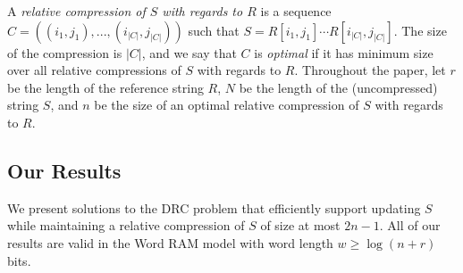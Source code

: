 A \emph{relative compression of $S$ with regards to $R$} is a sequence $C=((i_1,j_1),...,(i_{|C|},j_{|C|}))$ such that $S = R[i_1,j_1] \cdots R[i_{|C|},j_{|C|}]$. The size of the compression is $|C|$, and we say that $C$ is \emph{optimal} if it has minimum size over all relative compressions of $S$ with regards to $R$. Throughout the paper, let $r$ be the length of the reference string $R$, $N$ be the length of the (uncompressed) string $S$, and $n$ be the size of an optimal relative compression of $S$ with regards to $R$.






\subsection{Our Results}
We present solutions to the DRC problem that efficiently support updating $S$ while maintaining a relative compression of $S$ of size at most $2n-1$. All of our results are valid in the Word RAM model with word length $w \geq \log (n+r)$ bits. 

